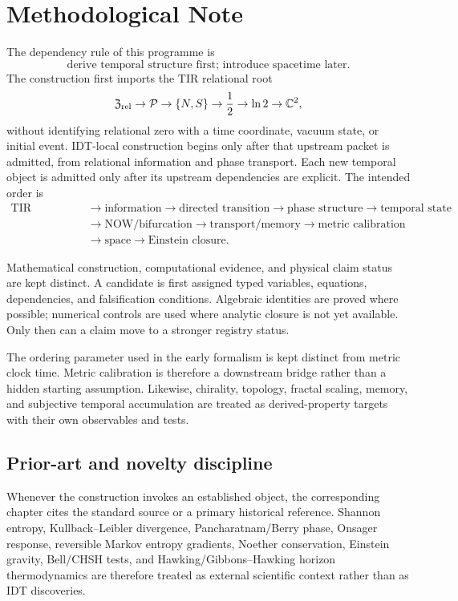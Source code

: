 
\chapter*{Methodological Note}

The dependency rule of this programme is
\[
\boxed{\text{derive temporal structure first; introduce spacetime later}.}
\]
The construction first imports the TIR relational root
\[
\mathfrak Z_{\rm rel}
\to\mathcal P
\to\{N,S\}
\to\frac12
\to\ln2
\to\mathbb C^2,
\]
without identifying relational zero with a time coordinate, vacuum state, or initial event. IDT-local construction begins only after that upstream packet is admitted, from relational information and phase transport. Each new temporal object is admitted only after its upstream dependencies are explicit. The intended order is
\[
\begin{aligned}
\text{TIR relational root}
&\to\text{information}
\to\text{directed transition}
\to\text{phase structure}
\to\text{temporal state}\\
&\to\text{NOW/bifurcation}
\to\text{transport/memory}
\to\text{metric calibration}\\
&\to\text{space}
\to\text{Einstein closure}.
\end{aligned}
\]

Mathematical construction, computational evidence, and physical claim status are kept distinct. A candidate is first assigned typed variables, equations, dependencies, and falsification conditions. Algebraic identities are proved where possible; numerical controls are used where analytic closure is not yet available. Only then can a claim move to a stronger registry status.

The ordering parameter used in the early formalism is kept distinct from metric clock time. Metric calibration is therefore a downstream bridge rather than a hidden starting assumption. Likewise, chirality, topology, fractal scaling, memory, and subjective temporal accumulation are treated as derived-property targets with their own observables and tests.

\section*{Prior-art and novelty discipline}

Whenever the construction invokes an established object, the corresponding chapter cites the standard source or a primary historical reference. Shannon entropy, Kullback--Leibler divergence, Pancharatnam/Berry phase, Onsager response, reversible Markov entropy gradients, Noether conservation, Einstein gravity, Bell/CHSH tests, and Hawking/Gibbons--Hawking horizon thermodynamics are therefore treated as external scientific context rather than as IDT discoveries.

